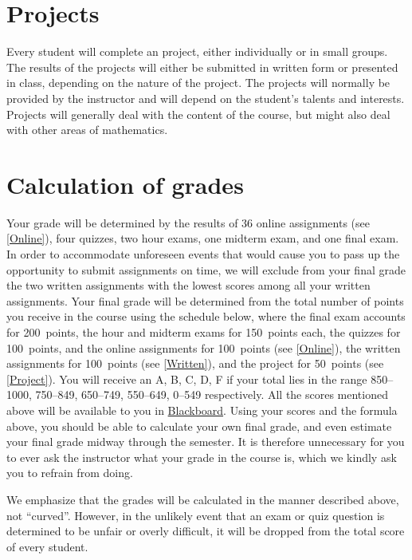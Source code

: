 \documentclass[11pt]{article}
\begin{document}
\section{Projects}\label{Projects}
Every student will complete an project, either individually
or in small groups. The results of the projects
will either be submitted in written form or presented
in class, depending on the nature of the project.
The projects will normally be provided by the instructor
and will depend on the student's
talents and interests. Projects will generally deal with the content of the course,
but might also deal with other areas of mathematics.

\section{Calculation of grades}\label{Assessment}
Your grade will be determined by the results of 
36 online assignments (see \autoref{Online}),
four quizzes, two hour exams, one midterm exam, and one 
final exam.
In order to accommodate unforeseen events that would cause you
to pass up the opportunity to submit assignments on time,
we will exclude from your final grade
the two written assignments with the lowest scores among
all your written assignments.
Your final grade will be determined from the total
number of points you receive in the course using the schedule below,
where the final exam accounts for 200~points,
the hour and midterm exams for 150~points each,
the quizzes for 100~points,
and the online assignments for 100~points (see \autoref{Online}),
the written assignments for 100~points (see \autoref{Written}),
and the project for 50~points (see \autoref{Project}).
You will receive an A, B, C, D, F if your total lies in the range
850--1000, 750--849, 650--749, 550--649, 0--549 respectively.
All the scores mentioned above will be available to you in
\href{https://bb.its.iastate.edu}{Blackboard}. Using your scores
and the formula above, you should be able to calculate your own final grade,
and even estimate your final grade midway through the semester.
It is therefore unnecessary for you to ever ask the instructor
what your grade in the course is, which we kindly ask you to refrain from
doing.

We emphasize that the grades will be calculated in the manner described
above, not ``curved''.
However, in the unlikely event that an exam or quiz question is determined
to be unfair or overly difficult, it will be dropped from the total score of
every student.
\end{document}
